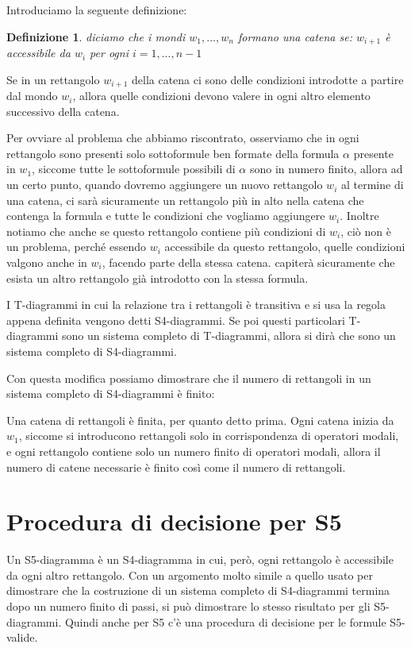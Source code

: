 \documentclass[a4paper, titlepage, 12pt]{report}
\newtheorem{definition}{Definizione}[chapter]
\begin{document}
Introduciamo la seguente definizione:
\begin{definition}
diciamo che i mondi $w_1, ..., w_n$ formano una catena se:
$w_{i+1}$ è accessibile da $w_i$ per ogni $i = 1, ..., n-1$
\end{definition}

Se in un rettangolo $w_{i+1}$ della catena ci sono delle condizioni introdotte
a partire dal mondo $w_i$, allora quelle condizioni devono valere
in ogni altro elemento successivo della catena.

Per ovviare al problema che abbiamo riscontrato, osserviamo che
in ogni rettangolo sono presenti solo
sottoformule ben formate della formula $\alpha$ presente in $w_1$,
siccome tutte le sottoformule possibili di $\alpha$ sono in numero finito,
allora ad un certo punto, quando dovremo aggiungere un nuovo rettangolo $w_i$
al termine di una catena, ci sarà sicuramente un rettangolo più in alto nella catena
che contenga la formula e tutte le condizioni che vogliamo aggiungere $w_i$.
Inoltre notiamo che anche se questo rettangolo contiene più condizioni di $w_i$,
ciò non è un problema, perché essendo $w_i$ accessibile da questo rettangolo,
quelle condizioni valgono anche in $w_i$, facendo parte della stessa catena.
capiterà sicuramente che esista un altro rettangolo già introdotto
con la stessa formula.

I T-diagrammi in cui la relazione tra i rettangoli è transitiva e si usa la regola
appena definita vengono detti S4-diagrammi. Se poi questi particolari T-diagrammi
sono un sistema completo di T-diagrammi, allora si dirà che sono un sistema
completo di S4-diagrammi.


Con questa modifica possiamo dimostrare che il numero di rettangoli in un sistema
completo di S4-diagrammi è finito:

Una catena di rettangoli è finita, per quanto detto prima.
Ogni catena inizia da $w_1$, siccome si introducono rettangoli
solo in corrispondenza di operatori modali, e ogni rettangolo contiene solo un numero finito
di operatori modali, allora il numero di catene necessarie è finito
così come il numero di rettangoli.

\section{Procedura di decisione per S5}
Un S5-diagramma è un S4-diagramma in cui, però, ogni rettangolo è accessibile
da ogni altro rettangolo. Con un argomento molto simile a quello usato
per dimostrare che la costruzione di un sistema completo di S4-diagrammi termina dopo
un numero finito di passi, si può dimostrare lo stesso risultato per gli S5-diagrammi.
Quindi anche per S5 c'è una procedura di decisione per le formule S5-valide.
\end{document}
